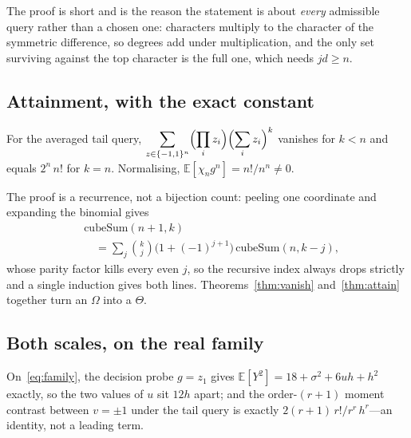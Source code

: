 
The proof is short and is the reason the statement is about \emph{every} admissible query
rather than a chosen one: characters multiply to the character of the symmetric difference,
so degrees add under multiplication, and the only set surviving against the top character is
the full one, which needs $jd\ge n$.

\subsection{Attainment, with the exact constant}

\begin{theorem}[Attainment]
\label{thm:attain}
For the averaged tail query,
$\displaystyle\sum_{z\in\{-1,1\}^{n}}\Bigl(\prod_{i}z_{i}\Bigr)\Bigl(\sum_{i}z_{i}\Bigr)^{k}$
vanishes for $k<n$ and equals $2^{n}\,n!$ for $k=n$. Normalising,
$\mathbb{E}[\chi_{n}g^{n}]=n!/n^{n}\neq0$.
\end{theorem}


The proof is a recurrence, not a bijection count: peeling one coordinate and expanding the
binomial gives
\begin{equation}
\begin{split}
&\mathrm{cubeSum}(n{+}1,k)\\
&\quad=\sum_{j}\binom{k}{j}\bigl(1+(-1)^{j+1}\bigr)\,\mathrm{cubeSum}(n,k{-}j),
\end{split}
\label{eq:rec}
\end{equation}
whose parity factor kills every even $j$, so the recursive index always drops strictly and a
single induction gives both lines. Theorems~\ref{thm:vanish} and~\ref{thm:attain} together
turn an $\Omega$ into a $\Theta$.

\subsection{Both scales, on the real family}

On~\eqref{eq:family}, the decision probe $g=z_{1}$ gives
$\mathbb{E}[Y^{2}]=18+\sigma^{2}+6uh+h^{2}$ exactly, so the two values of $u$ sit $12h$
apart; and the order-$(r{+}1)$ moment contrast between $v=\pm1$ under the tail query is
exactly $2(r{+}1)\,r!/r^{r}\,h^{r}$---an identity, not a leading term. \CERT{}

